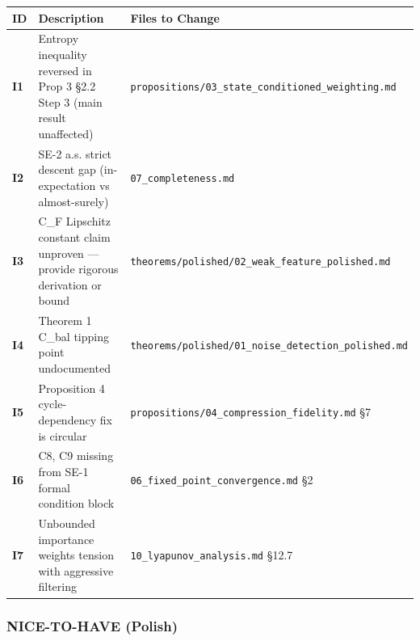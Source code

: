 \documentclass[
  12pt,
]{ctexart}
\begin{document}
\begin{longtable}[]{@{}
  >{\raggedright\arraybackslash}p{}
  >{\raggedright\arraybackslash}p{}
  >{\raggedright\arraybackslash}p{}@{}}
\toprule\noalign{}
\begin{minipage}[b]{\linewidth}\raggedright
ID
\end{minipage} & \begin{minipage}[b]{\linewidth}\raggedright
Description
\end{minipage} & \begin{minipage}[b]{\linewidth}\raggedright
Files to Change
\end{minipage} \\
\midrule\noalign{}
\endhead
\bottomrule\noalign{}
\endlastfoot
\textbf{I1} & Entropy inequality reversed in Prop 3 §2.2 Step 3 (main
result unaffected) &
\texttt{propositions/03\_state\_conditioned\_weighting.md} \\
\textbf{I2} & SE-2 a.s. strict descent gap (in-expectation vs
almost-surely) & \texttt{07\_completeness.md} \\
\textbf{I3} & C\_F Lipschitz constant claim unproven --- provide
rigorous derivation or bound &
\texttt{theorems/polished/02\_weak\_feature\_polished.md} \\
\textbf{I4} & Theorem 1 C\_bal tipping point undocumented &
\texttt{theorems/polished/01\_noise\_detection\_polished.md} \\
\textbf{I5} & Proposition 4 cycle-dependency fix is circular &
\texttt{propositions/04\_compression\_fidelity.md} §7 \\
\textbf{I6} & C8, C9 missing from SE-1 formal condition block &
\texttt{06\_fixed\_point\_convergence.md} §2 \\
\textbf{I7} & Unbounded importance weights tension with aggressive
filtering & \texttt{10\_lyapunov\_analysis.md} §12.7 \\
\end{longtable}

\subsubsection{NICE-TO-HAVE (Polish)}\label{nice-to-have-polish}
\end{document}
